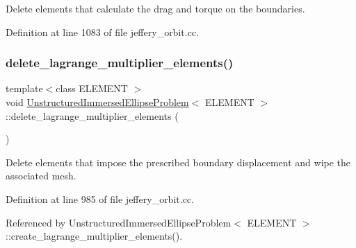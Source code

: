 Delete elements that calculate the drag and torque on the boundaries. 



Definition at line 1083 of file jeffery\+\_\+orbit.\+cc.

\mbox{\label{classUnstructuredImmersedEllipseProblem_a51555f77dc360c94591ee68c3fc9928a}} 
\subsubsection{\texorpdfstring{delete\+\_\+lagrange\+\_\+multiplier\+\_\+elements()}{delete\_lagrange\_multiplier\_elements()}}
{\footnotesize\ttfamily template$<$class E\+L\+E\+M\+E\+NT $>$ \\
void \hyperlink{classUnstructuredImmersedEllipseProblem}{Unstructured\+Immersed\+Ellipse\+Problem}$<$ E\+L\+E\+M\+E\+NT $>$\+::delete\+\_\+lagrange\+\_\+multiplier\+\_\+elements (\begin{DoxyParamCaption}{ }\end{DoxyParamCaption})\hspace{0.3cm}{\ttfamily [private]}}



Delete elements that impose the prescribed boundary displacement and wipe the associated mesh. 



Definition at line 985 of file jeffery\+\_\+orbit.\+cc.



Referenced by Unstructured\+Immersed\+Ellipse\+Problem$<$ E\+L\+E\+M\+E\+N\+T $>$\+::create\+\_\+lagrange\+\_\+multiplier\+\_\+elements().

\mbox{\label{classUnstructuredImmersedEllipseProblem_a08e12dd83c98f96e14e8152cc758d398}} 
